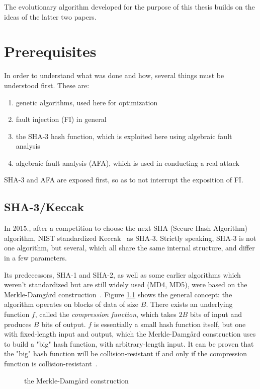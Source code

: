 \documentclass[times, utf8, diplomski]{fer}
\begin{document}
The evolutionary algorithm developed for the purpose of this thesis builds on
the ideas of the latter two papers.



\chapter{Prerequisites}\label{ch:prerequisites}
In order to understand what was done and how, several things must be understood
first. These are:
\begin{enumerate}
    \item genetic algorithms, used here for optimization
    \item fault injection (FI) in general
    \item the SHA-3 hash function, which is exploited here using algebraic fault analysis
    \item algebraic fault analysis (AFA), which is used in conducting a real attack
\end{enumerate}

SHA-3 and AFA are exposed first, so as to not interrupt the exposition of FI.


\section{SHA-3/Keccak}\label{sec:keccak}
In 2015., after a competition to choose the next SHA (Secure Hash Algorithm)
algorithm, NIST standardized Keccak~\cite{keccak_reference} as SHA-3.
Strictly speaking, SHA-3 is not one algorithm, but several, which all share
the same internal structure, and differ in a few parameters.

Its predecessors, SHA-1 and SHA-2, as well as some earlier algorithms which
weren't standardized but are still widely used (MD4, MD5), were based on the
Merkle-Damgård construction~\cite{merkle-damgard_reference}. Figure \ref{fig:merkle-damgard}
shows the general concept: the algorithm operates on blocks of data of size $B$.
There exists an underlying function $f$, called the \emph{compression function},
which takes $2B$ bits of input and produces $B$ bits of output. $f$ is essentially
a small hash function itself, but one with fixed-length input and output, which
the Merkle-Damgård construction uses to build a "big" hash function, with
arbitrary-length input. It can be proven that the "big" hash function will
be collision-resistant if and only if the compression function is
collision-resistant~\cite{TODO}.

\begin{figure}[htb]\label{fig:merkle-damgard}
    \centering
    \caption{the Merkle-Damgård construction}
\end{figure}
\end{document}
